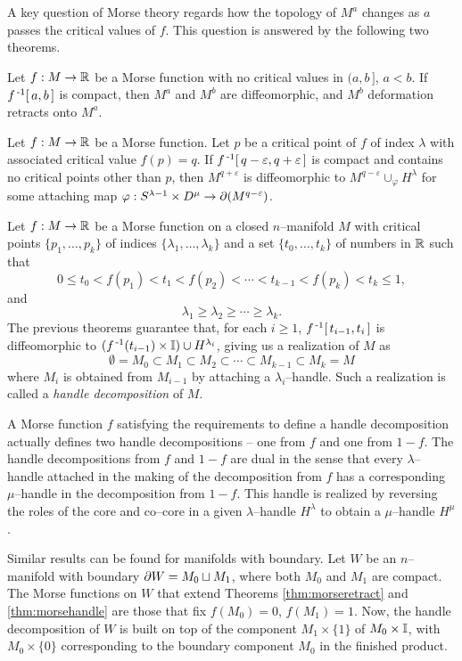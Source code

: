 A key question of Morse theory regards how the topology of $M^a$ changes as $a$ passes the critical values of $f$.
This question is answered by the following two theorems.

\begin{theorem}
  \label{thm:morseretract}
  Let $f:M\to\mathbb{R}$ be a Morse function with no critical values in $(a,b\,]$, $a<b$.
  If $f^{\,\text{-}1}[\,a,b\,]$ is compact, then $M^a$ and $M^b$ are diffeomorphic, and $M^b$ deformation retracts onto $M^a$.
\end{theorem}

\begin{theorem}
  \label{thm:morsehandle}
  Let $f:M\to\mathbb{R}$ be a Morse function.
  Let $p$ be a critical point of $f$ of index $\lambda$ with associated critical value $f(p)=q$.
  If $f^{\,\text{-}1}[\,q-\varepsilon, q+\varepsilon\,]$ is compact and contains no critical points other than $p$, then $M^{q+\varepsilon}$ is diffeomorphic to $M^{q-\varepsilon}\cup_\varphi H^\lambda$ for some attaching map $\varphi:S^{\lambda-1}\times D^\mu\to \partial(M^{q-\varepsilon})$.
\end{theorem}

\begin{defn}
  Let $f:M\to\mathbb{R}$ be a Morse function on a closed $n$--manifold $M$ with critical points $\{p_1,\dots,p_k\}$ of indices $\{\lambda_1,\dots,\lambda_k\}$ and a set $\{t_0,\dots,t_k\}$ of numbers in $\mathbb{R}$ such that
  \[
	0\leq t_0 < f(p_1) < t_1 < f(p_2) < \cdots < t_{k-1} < f(p_k) < t_k \leq 1,
  \]
  and
  \[
	  \lambda_1 \geq \lambda_2 \geq \cdots \geq \lambda_k.
  \]
  The previous theorems guarantee that, for each $i\geq 1$, $f^{\,\text{-}1}[\,t_{i-1},t_i\,]$ is diffeomorphic to $(f^{\,\text{-}1}(t_{i-1})\times\mathbb{I})\cup H^{\lambda_i}$, giving us a realization of $M$ as
  \[
	  \emptyset = M_0 \subset M_1 \subset M_2 \subset \cdots \subset M_{k-1} \subset M_k = M
  \]
  where $M_i$ is obtained from $M_{i-1}$ by attaching a $\lambda_i$--handle.
  Such a realization is called a \emph{handle decomposition} of $M$.
\end{defn}

A Morse function $f$ satisfying the requirements to define a handle decomposition actually defines two handle decompositions -- one from $f$ and one from $1-f$.
The handle decompositions from $f$ and $1-f$ are dual in the sense that every $\lambda$--handle attached in the making of the decomposition from $f$ has a corresponding $\mu$--handle in the decomposition from $1-f$.
This handle is realized by reversing the roles of the core and co--core in a given $\lambda$--handle $H^\lambda$ to obtain a $\mu$--handle $H^\mu$.

Similar results can be found for manifolds with boundary.
Let $W$ be an $n$--manifold with boundary $\partial W = M_0\sqcup M_1$, where both $M_0$ and $M_1$ are compact.
The Morse functions on $W$ that extend Theorems \ref{thm:morseretract} and \ref{thm:morsehandle} are those that fix $f(M_0)=0$, $f(M_1)=1$.
Now, the handle decomposition of $W$ is built on top of the component $M_1\times\{1\}$ of $M_0\times\mathbb{I}$, with $M_0\times\{0\}$ corresponding to the boundary component $M_0$ in the finished product.
